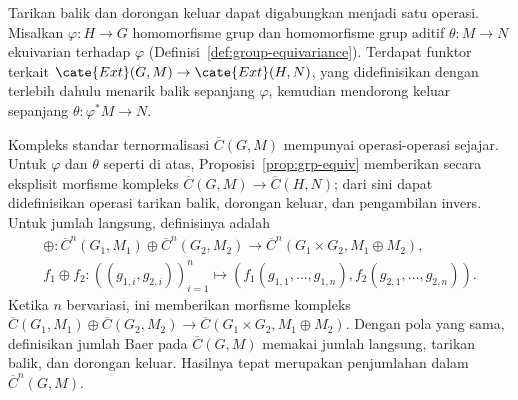Tarikan balik dan dorongan keluar dapat digabungkan menjadi satu operasi.
Misalkan $\varphi:H\to G$ homomorfisme grup dan homomorfisme grup aditif
$\theta:M\to N$ ekuivarian terhadap $\varphi$
(Definisi~\ref{def:group-equivariance}). Terdapat funktor terkait
$\cate{Ext}(G,M)\to\cate{Ext}(H,N)$, yang didefinisikan dengan terlebih dahulu
menarik balik sepanjang $\varphi$, kemudian mendorong keluar sepanjang
$\theta:\varphi^*M\to N$.

Kompleks standar ternormalisasi $\overline{C}(G,M)$ mempunyai operasi-operasi
sejajar. Untuk $\varphi$ dan $\theta$ seperti di atas,
Proposisi~\ref{prop:grp-equiv} memberikan secara eksplisit morfisme kompleks
$\overline{C}(G,M)\to\overline{C}(H,N)$; dari sini dapat didefinisikan operasi
tarikan balik, dorongan keluar, dan pengambilan invers. Untuk jumlah langsung,
definisinya adalah
\begin{gather*}
	\oplus:\overline{C}^n(G_1,M_1)\oplus\overline{C}^n(G_2,M_2)
	\to\overline{C}^n(G_1\times G_2,M_1\oplus M_2),\\
	f_1\oplus f_2:((g_{1,i},g_{2,i}))_{i=1}^n\mapsto
	\left(f_1(g_{1,1},\ldots,g_{1,n}),
	f_2(g_{2,1},\ldots,g_{2,n})\right).
\end{gather*}
Ketika $n$ bervariasi, ini memberikan morfisme kompleks
$\overline{C}(G_1,M_1)\oplus\overline{C}(G_2,M_2)
\to\overline{C}(G_1\times G_2,M_1\oplus M_2)$. Dengan pola yang sama,
definisikan jumlah Baer pada $\overline{C}(G,M)$ memakai jumlah langsung,
tarikan balik, dan dorongan keluar. Hasilnya tepat merupakan penjumlahan
dalam $\overline{C}^n(G,M)$.

